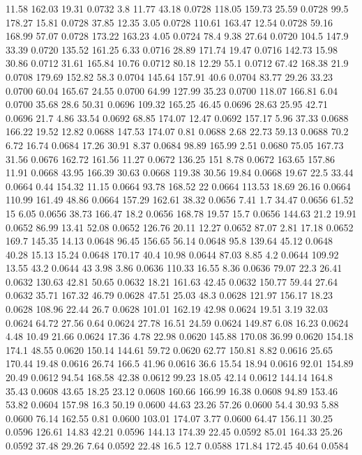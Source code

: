 11.58	162.03	19.31	0.0732
3.8	11.77	43.18	0.0728
118.05	159.73	25.59	0.0728
99.5	178.27	15.81	0.0728
37.85	12.35	3.05	0.0728
110.61	163.47	12.54	0.0728
59.16	168.99	57.07	0.0728
173.22	163.23	4.05	0.0724
78.4	9.38	27.64	0.0720
104.5	147.9	33.39	0.0720
135.52	161.25	6.33	0.0716
28.89	171.74	19.47	0.0716
142.73	15.98	30.86	0.0712
31.61	165.84	10.76	0.0712
80.18	12.29	55.1	0.0712
67.42	168.38	21.9	0.0708
179.69	152.82	58.3	0.0704
145.64	157.91	40.6	0.0704
83.77	29.26	33.23	0.0700
60.04	165.67	24.55	0.0700
64.99	127.99	35.23	0.0700
118.07	166.81	6.04	0.0700
35.68	28.6	50.31	0.0696
109.32	165.25	46.45	0.0696
28.63	25.95	42.71	0.0696
21.7	4.86	33.54	0.0692
68.85	174.07	12.47	0.0692
157.17	5.96	37.33	0.0688
166.22	19.52	12.82	0.0688
147.53	174.07	0.81	0.0688
2.68	22.73	59.13	0.0688
70.2	6.72	16.74	0.0684
17.26	30.91	8.37	0.0684
98.89	165.99	2.51	0.0680
75.05	167.73	31.56	0.0676
162.72	161.56	11.27	0.0672
136.25	151	8.78	0.0672
163.65	157.86	11.91	0.0668
43.95	166.39	30.63	0.0668
119.38	30.56	19.84	0.0668
19.67	22.5	33.44	0.0664
0.44	154.32	11.15	0.0664
93.78	168.52	22	0.0664
113.53	18.69	26.16	0.0664
110.99	161.49	48.86	0.0664
157.29	162.61	38.32	0.0656
7.41	1.7	34.47	0.0656
61.52	15	6.05	0.0656
38.73	166.47	18.2	0.0656
168.78	19.57	15.7	0.0656
144.63	21.2	19.91	0.0652
86.99	13.41	52.08	0.0652
126.76	20.11	12.27	0.0652
87.07	2.81	17.18	0.0652
169.7	145.35	14.13	0.0648
96.45	156.65	56.14	0.0648
95.8	139.64	45.12	0.0648
40.28	15.13	15.24	0.0648
170.17	40.4	10.98	0.0644
87.03	8.85	4.2	0.0644
109.92	13.55	43.2	0.0644
43	3.98	3.86	0.0636
110.33	16.55	8.36	0.0636
79.07	22.3	26.41	0.0632
130.63	42.81	50.65	0.0632
18.21	161.63	42.45	0.0632
150.77	59.44	27.64	0.0632
35.71	167.32	46.79	0.0628
47.51	25.03	48.3	0.0628
121.97	156.17	18.23	0.0628
108.96	22.44	26.7	0.0628
101.01	162.19	42.98	0.0624
19.51	3.19	32.03	0.0624
64.72	27.56	0.64	0.0624
27.78	16.51	24.59	0.0624
149.87	6.08	16.23	0.0624
4.48	10.49	21.66	0.0624
17.36	4.78	22.98	0.0620
145.88	170.08	36.99	0.0620
154.18	174.1	48.55	0.0620
150.14	144.61	59.72	0.0620
62.77	150.81	8.82	0.0616
25.65	170.44	19.48	0.0616
26.74	166.5	41.96	0.0616
36.6	15.54	18.94	0.0616
92.01	154.89	20.49	0.0612
94.54	168.58	42.38	0.0612
99.23	18.05	42.14	0.0612
144.14	164.8	35.43	0.0608
43.65	18.25	23.12	0.0608
160.66	166.99	16.38	0.0608
94.89	153.46	53.82	0.0604
157.98	16.3	50.19	0.0600
44.63	23.26	57.26	0.0600
54.4	30.93	5.88	0.0600
76.14	162.55	0.81	0.0600
103.01	174.07	3.77	0.0600
64.47	156.11	30.25	0.0596
126.61	14.83	42.21	0.0596
144.13	174.39	22.45	0.0592
85.01	164.33	25.26	0.0592
37.48	29.26	7.64	0.0592
22.48	16.5	12.7	0.0588
171.84	172.45	40.64	0.0584
